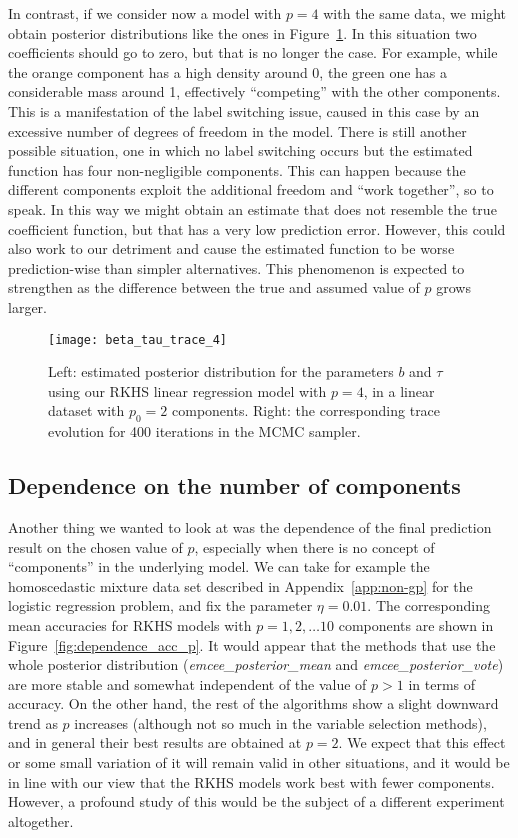 In contrast, if we consider now a model with \(p=4\) with the same data, we might obtain posterior distributions like the ones in Figure~\ref{fig:beta_tau_trace_4}. In this situation two coefficients should go to zero, but that is no longer the case. For example, while the orange component has a high density around 0, the green one has a considerable mass around 1, effectively ``competing'' with the other components. This is a manifestation of the label switching issue, caused in this case by an excessive number of degrees of freedom in the model. There is still another possible situation, one in which no label switching occurs but the estimated function has four non-negligible components. This can happen because the different components exploit the additional freedom and ``work together'', so to speak. In this way we might obtain an estimate that does not resemble the true coefficient function, but that has a very low prediction error. However, this could also work to our detriment and cause the estimated function to be worse prediction-wise than simpler alternatives. This phenomenon is expected to strengthen as the difference between the true and assumed value of \(p\) grows larger.

\begin{figure}[ht!]
    \centering
    \texttt{[image: beta\_tau\_trace\_4]}
    \caption{Left: estimated posterior distribution for the parameters \(b\) and \(\tau\) using our RKHS linear regression model with \(p=4\), in a linear dataset with \(p_0=2\) components. Right: the corresponding trace evolution for 400 iterations in the MCMC sampler.}\label{fig:beta_tau_trace_4}
\end{figure}

\subsection{Dependence on the number of components}

Another thing we wanted to look at was the dependence of the final prediction result on the chosen value of \(p\), especially when there is no concept of ``components'' in the underlying model. We can take for example the homoscedastic mixture data set described in Appendix~\ref{app:non-gp} for the logistic regression problem, and fix the parameter \(\eta=0.01\). The corresponding mean accuracies for RKHS models with \(p=1,2,\dots 10\) components are shown in Figure~\ref{fig:dependence_acc_p}. It would appear that the methods that use the whole posterior distribution (\textit{emcee\_posterior\_mean} and \textit{emcee\_posterior\_vote}) are more stable and somewhat independent of the value of \(p>1\) in terms of accuracy. On the other hand, the rest of the algorithms show a slight downward trend as \(p\) increases (although not so much in the variable selection methods), and in general their best results are obtained at \(p=2\). We expect that this effect or some small variation of it will remain valid in other situations, and it would be in line with our view that the RKHS models work best with fewer components. However, a profound study of this would be the subject of a different experiment altogether.

